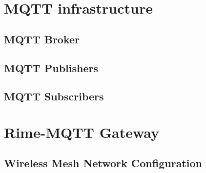 \documentclass[a4paper,11pt]{article}
\begin{document}
\section{MQTT infrastructure}
\subsection{MQTT Broker}
\subsection{MQTT Publishers}
\subsection{MQTT Subscribers}

\section{Rime-MQTT Gateway}
\subsection{Wireless Mesh Network Configuration}
\end{document}

